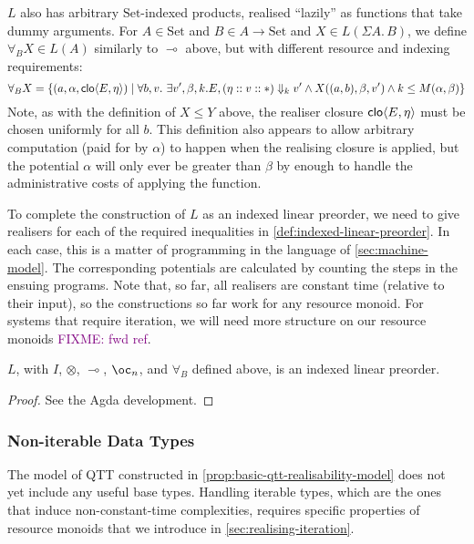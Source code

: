 \documentclass[acmsmall,review]{acmart}
\newcommand{\Set}{\mathrm{Set}}
\newcommand{\bob}[1]{\textcolor{purple}{FIXME: #1}}
\begin{document}
$L$ also has arbitrary $\Set$-indexed products, realised ``lazily'' as
functions that take dummy arguments. For $A \in \Set$ and
$B \in A \to \Set$ and $X \in L(\Sigma A.\,B)$, we define
$\forall_B X \in L(A)$ similarly to $\multimap$ above, but with
different resource and indexing requirements:
\begin{displaymath}
  \forall_B X = \{ (a,\alpha,\mathsf{clo}\langle E , \eta \rangle) \mid \forall b, v.~\exists v', \beta, k. E, (\eta :: v :: *) \Downarrow_k v' \land X((a,b),\beta,v') \land k \leq M(\alpha,\beta) \}
\end{displaymath}
Note, as with the definition of $X \leq Y$ above, the realiser closure
$\mathsf{clo}\langle E , \eta \rangle$ must be chosen uniformly for all $b$. This definition
also appears to allow arbitrary computation (paid for by $\alpha$) to
happen when the realising closure is applied, but the potential
$\alpha$ will only ever be greater than $\beta$ by enough to handle
the administrative costs of applying the function.

To complete the construction of $L$ as an indexed linear preorder, we
need to give realisers for each of the required inequalities in
\autoref{def:indexed-linear-preorder}. In each case, this is a matter
of programming in the language of \autoref{sec:machine-model}. The
corresponding potentials are calculated by counting the steps in the
ensuing programs. Note that, so far, all realisers are constant time
(relative to their input), so the constructions so far work for any
resource monoid. For systems that require iteration, we will need more
structure on our resource monoids \bob{fwd ref}.

\begin{proposition}
  $L$, with $I$, $\otimes$, $\multimap$, $\oc_n$, and $\forall_{B}$ defined above, is
  an indexed linear preorder.
\end{proposition}

\begin{proof}
  See the Agda development.
\end{proof}

\subsubsection{Non-iterable Data Types}

The model of QTT constructed in
\autoref{prop:basic-qtt-realisability-model} does not yet include any
useful base types. Handling iterable types, which are the ones that
induce non-constant-time complexities, requires specific properties of
resource monoids that we introduce in
\autoref{sec:realising-iteration}.
\end{document}
